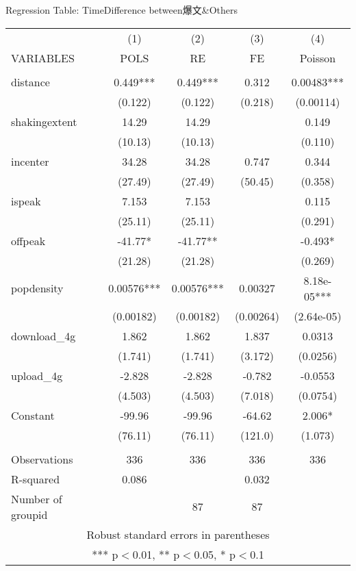 \begin{frame}[fragile]{Regression Table: TimeDifference between爆文\&Others}

\begin{table}[htbp]
\tiny

\begin{tabular}{lcccc} \hline
 & (1) & (2) & (3) & (4) \\
VARIABLES & POLS & RE & FE & Poisson \\ \hline
 &  &  &  &  \\
distance & 0.449*** & 0.449*** & 0.312 & 0.00483*** \\
 & (0.122) & (0.122) & (0.218) & (0.00114) \\
shakingextent & 14.29 & 14.29 &  & 0.149 \\
 & (10.13) & (10.13) &  & (0.110) \\
incenter & 34.28 & 34.28 & 0.747 & 0.344 \\
 & (27.49) & (27.49) & (50.45) & (0.358) \\
ispeak & 7.153 & 7.153 &  & 0.115 \\
 & (25.11) & (25.11) &  & (0.291) \\
offpeak & -41.77* & -41.77** &  & -0.493* \\
 & (21.28) & (21.28) &  & (0.269) \\
popdensity & 0.00576*** & 0.00576*** & 0.00327 & 8.18e-05*** \\
 & (0.00182) & (0.00182) & (0.00264) & (2.64e-05) \\
download\_4g & 1.862 & 1.862 & 1.837 & 0.0313 \\
 & (1.741) & (1.741) & (3.172) & (0.0256) \\
upload\_4g & -2.828 & -2.828 & -0.782 & -0.0553 \\
 & (4.503) & (4.503) & (7.018) & (0.0754) \\
Constant & -99.96 & -99.96 & -64.62 & 2.006* \\
 & (76.11) & (76.11) & (121.0) & (1.073) \\
 &  &  &  &  \\
Observations & 336 & 336 & 336 & 336 \\
R-squared & 0.086 &  & 0.032 &  \\
 Number of groupid &  & 87 & 87 &  \\ \hline
\multicolumn{5}{c}{ Robust standard errors in parentheses} \\
\multicolumn{5}{c}{ *** p$<$0.01, ** p$<$0.05, * p$<$0.1} \\
\end{tabular}

\end{table}
\end{frame}




